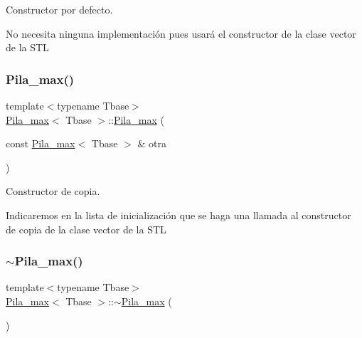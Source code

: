 Constructor por defecto. 

No necesita ninguna implementación pues usará el constructor de la clase vector de la S\+TL \mbox{\label{classPila__max_ab5710c39c42d4d089736bba758c54f69}} 
\subsubsection{\texorpdfstring{Pila\+\_\+max()}{Pila\_max()}\hspace{0.1cm}{\footnotesize\ttfamily [2/4]}}
{\footnotesize\ttfamily template$<$typename Tbase$>$ \\
\hyperlink{classPila__max}{Pila\+\_\+max}$<$ Tbase $>$\+::\hyperlink{classPila__max}{Pila\+\_\+max} (\begin{DoxyParamCaption}\item[{const \hyperlink{classPila__max}{Pila\+\_\+max}$<$ Tbase $>$ \&}]{otra }\end{DoxyParamCaption})\hspace{0.3cm}{\ttfamily [inline]}}



Constructor de copia. 

Indicaremos en la lista de inicialización que se haga una llamada al constructor de copia de la clase vector de la S\+TL \mbox{\label{classPila__max_a84d64a0a0cece968a752cc5fb554b362}} 
\subsubsection{\texorpdfstring{$\sim$\+Pila\+\_\+max()}{~Pila\_max()}\hspace{0.1cm}{\footnotesize\ttfamily [1/2]}}
{\footnotesize\ttfamily template$<$typename Tbase$>$ \\
\hyperlink{classPila__max}{Pila\+\_\+max}$<$ Tbase $>$\+::$\sim$\hyperlink{classPila__max}{Pila\+\_\+max} (\begin{DoxyParamCaption}{ }\end{DoxyParamCaption})\hspace{0.3cm}{\ttfamily [default]}}



